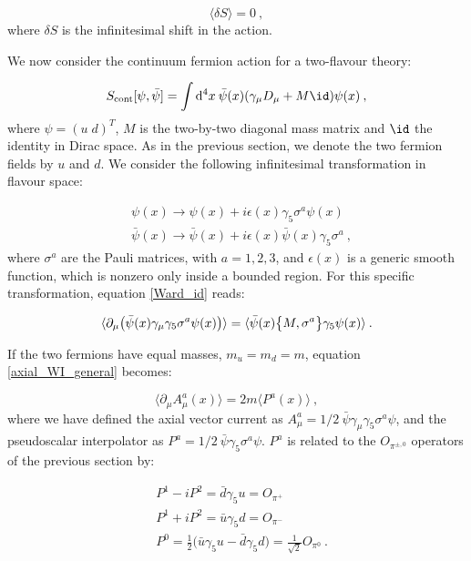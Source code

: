 \begin{equation}
\langle \delta S \rangle = 0 \: ,
\label{Ward_id}
\end{equation}
%
where $\delta S$ is the infinitesimal shift in the action.

We now consider the continuum fermion action for a two-flavour theory:

\begin{equation}
S_{\mathrm{cont}}[\psi, \bar \psi] =  \int \dx  \: \bar \psi(x)(\gamma_{\mu} D_{\mu} + M \id) \psi(x) \: ,
\end{equation}
%
where $\psi = (u \; d)^T$, $M$ is the two-by-two diagonal mass matrix and $\id$ the identity in Dirac space. As in the previous section, we denote the two fermion fields by $u$ and $d$. We consider the following infinitesimal transformation in flavour space:

\begin{equation}
\begin{split}
& \psi(x) \to \psi(x) + i \epsilon(x) \gamma_5 \sigma^a \psi(x) \\
& \bar\psi(x) \to \bar\psi(x) + i \epsilon(x) \bar \psi(x) \gamma_5 \sigma^a \: ,
\end{split}
\end{equation}
%
where $\sigma^a$ are the Pauli matrices, with $a=1,2,3$, and $\epsilon(x)$ is a generic smooth function, which is nonzero only inside a bounded region. For this specific transformation, equation \ref{Ward_id} reads:

\begin{equation}
\langle \partial_{\mu} \bigl(\bar \psi(x) \gamma_{\mu} \gamma_5 \sigma^a \psi(x)\bigr) \rangle = \langle \bar\psi(x) \qty \big{M,\sigma^a} \gamma_5 \psi(x) \rangle \: .
\label{axial_WI_general}
\end{equation}

If the two fermions have equal masses, $m_u = m_d = m$, equation \ref{axial_WI_general} becomes:

\begin{equation}
\langle \partial_{\mu} A^a_{\mu} (x) \rangle = 2 m \langle P^a(x) \rangle \: ,
\label{PCAC}
\end{equation}
%
where we have defined the axial vector current as $A^a_{\mu} = 1/2 \: \bar \psi \gamma_{\mu} \gamma_5 \sigma^a \psi$, and the pseudoscalar interpolator as $P^a = 1/2 \: \bar\psi \gamma_5 \sigma^a \psi$. $P^a$ is related to the $O_{\pi^{\pm,0}}$ operators of the previous section by:

\begin{equation}
\begin{split}
& P^1 - iP^2 = \bar d \gamma_5 u = O_{\pi^+} \\
& P^1 + iP^2 = \bar u \gamma_5 d = O_{\pi^-} \\
& P^0 = \frac{1}{2} \bigl( \bar u \gamma_5 u - \bar d \gamma_5 d \bigr) = \frac{1}{\sqrt 2} O_{\pi^0} \: .
\end{split}
\end{equation}

